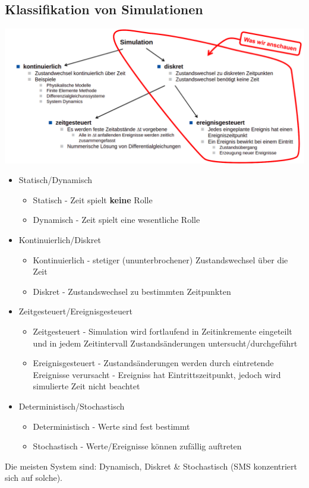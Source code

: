 \subsection{Klassifikation von Simulationen}
\begin{minipage}[t]{1\textwidth}
    \centering
	\includegraphics[width=0.9\linewidth]{images/klassifizierung-simulationen.png}
\end{minipage}
\begin{itemize}
    \item Statisch/Dynamisch
    \begin{itemize}
        \item Statisch - Zeit spielt \textbf{keine} Rolle
        \item Dynamisch - Zeit spielt eine wesentliche Rolle
    \end{itemize}
    \item Kontinuierlich/Diskret
    \begin{itemize}
        \item Kontinuierlich - stetiger (ununterbrochener) Zustandswechsel über die Zeit
        \item Diskret - Zustandswechsel zu bestimmten Zeitpunkten
    \end{itemize}
    \item Zeitgesteuert/Ereignisgesteuert
    \begin{itemize}
        \item Zeitgesteuert - Simulation wird fortlaufend in Zeitinkremente eingeteilt und in jedem Zeitintervall Zustandsänderungen untersucht/durchgeführt
        \item Ereignisgesteuert - Zustandsänderungen werden durch eintretende Ereignisse verursacht - Ereigniss hat Eintrittszeitpunkt, jedoch wird simulierte Zeit nicht beachtet
    \end{itemize}
    \item Deterministisch/Stochastisch
    \begin{itemize}
        \item Deterministisch - Werte sind fest bestimmt
        \item Stochastisch - Werte/Ereignisse können zufällig auftreten
    \end{itemize}
\end{itemize}
Die meisten System sind: Dynamisch, Diskret & Stochastisch (SMS konzentriert sich auf solche).
\\

